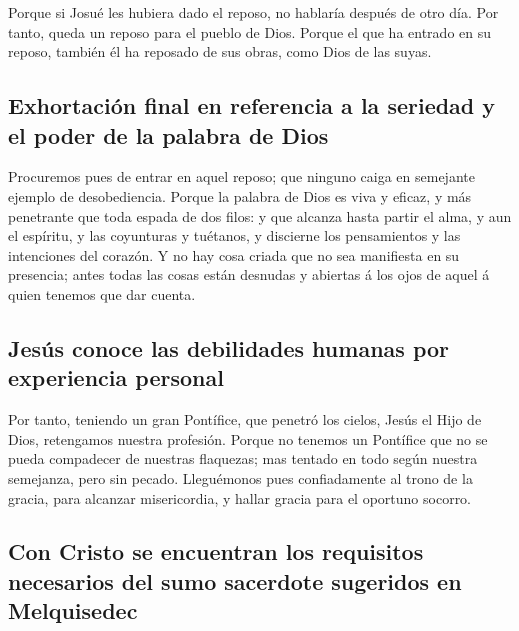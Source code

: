  Porque si Josué les hubiera dado el reposo, no hablaría
después de otro día.  Por tanto, queda un reposo para el
pueblo de Dios.  Porque el que ha entrado en su reposo,
también él ha reposado de sus obras, como Dios de las suyas.

\hypertarget{exhortaciuxf3n-final-en-referencia-a-la-seriedad-y-el-poder-de-la-palabra-de-dios}{%
\subsection{Exhortación final en referencia a la seriedad y el poder de
la palabra de
Dios}\label{exhortaciuxf3n-final-en-referencia-a-la-seriedad-y-el-poder-de-la-palabra-de-dios}}

 Procuremos pues de entrar en aquel reposo; que ninguno
caiga en semejante ejemplo de desobediencia.  Porque la
palabra de Dios es viva y eficaz, y más penetrante que toda espada de
dos filos: y que alcanza hasta partir el alma, y aun el espíritu, y las
coyunturas y tuétanos, y discierne los pensamientos y las intenciones
del corazón.  Y no hay cosa criada que no sea manifiesta en
su presencia; antes todas las cosas están desnudas y abiertas á los ojos
de aquel á quien tenemos que dar cuenta.

\hypertarget{jesuxfas-conoce-las-debilidades-humanas-por-experiencia-personal}{%
\subsection{Jesús conoce las debilidades humanas por experiencia
personal}\label{jesuxfas-conoce-las-debilidades-humanas-por-experiencia-personal}}

 Por tanto, teniendo un gran Pontífice, que penetró los
cielos, Jesús el Hijo de Dios, retengamos nuestra profesión.
 Porque no tenemos un Pontífice que no se pueda compadecer
de nuestras flaquezas; mas tentado en todo según nuestra semejanza, pero
sin pecado.  Lleguémonos pues confiadamente al trono de la
gracia, para alcanzar misericordia, y hallar gracia para el oportuno
socorro.

\hypertarget{con-cristo-se-encuentran-los-requisitos-necesarios-del-sumo-sacerdote-sugeridos-en-melquisedec}{%
\subsection{Con Cristo se encuentran los requisitos necesarios del sumo
sacerdote sugeridos en
Melquisedec}\label{con-cristo-se-encuentran-los-requisitos-necesarios-del-sumo-sacerdote-sugeridos-en-melquisedec}}

